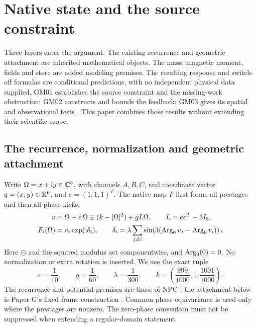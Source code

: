 \section{Native state and the source constraint}\label{sec:native}
Three layers enter the argument. The existing recurrence and geometric attachment are inherited mathematical objects. The mass, magnetic moment, fields and store are added modeling premises. The resulting response and switch-off formulas are conditional predictions, with no independent physical data supplied. GM01 establishes the source constraint and the missing-work obstruction; GM02 constructs and bounds the feedback; GM03 gives its spatial and observational tests \cite{GM01,GM02,GM03}. This paper combines those results without extending their scientific scope.

\subsection{The recurrence, normalization and geometric attachment}
Write \(\Omega=x+\mathrm i y\in\mathbb C^3\), with channels \(A,B,C\), real coordinate vector \(q=(x,y)\in\mathbb R^6\), and \(e=(1,1,1)^T\). The native map \(F\) first forms all prestages and then all phase kicks:
\begin{align}
 v&=\Omega+\varepsilon\,\Omega\odot(k-|\Omega|^2)+gL\Omega,\qquad L=ee^T-3I_3, \label{eq:native-pre}\\
 F_i(\Omega)&=v_i\exp(\mathrm i\delta_i),\qquad
 \delta_i=\lambda\sum_{j\ne i}\sin\!\left(3(\operatorname{Arg}_0 v_j-\operatorname{Arg}_0 v_i)\right).
 \label{eq:native-full}
\end{align}
Here \(\odot\) and the squared modulus act componentwise, and \(\operatorname{Arg}_0(0)=0\). No normalization or extra rotation is inserted. We use the exact tuple
\begin{equation}
 \varepsilon=\frac1{10},\qquad g=\frac1{60},\qquad
 \lambda=\frac1{300},\qquad
 k=\left(\frac{999}{1000},1,\frac{1001}{1000}\right).
 \label{eq:tuple}
\end{equation}
The recurrence and potential premises are those of NPC \cite{NPC}; the attachment below is Paper G's fixed-frame construction \cite{G}. Common-phase equivariance is used only where the prestages are nonzero. The zero-phase convention must not be suppressed when extending a regular-domain statement.

